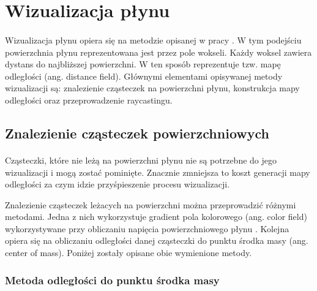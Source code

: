 \newpage

\section{Wizualizacja płynu}

\paragraph{}
Wizualizacja płynu opiera się na metodzie opisanej w pracy \cite{goswami10}. W tym podejściu powierzchnia płynu reprezentowana jest przez pole wokseli. Każdy woksel zawiera dystans do najbliższej powierzchni. W ten sposób reprezentuje tzw. mapę odległości (ang. distance field). Głównymi elementami opisywanej metody wizualizacji są: znalezienie cząsteczek na powierzchni płynu, konstrukcja mapy odległości oraz przeprowadzenie raycastingu.
\par

\subsection{Znalezienie cząsteczek powierzchniowych}

\paragraph{}
Cząsteczki, które nie leżą na powierzchni płynu nie są potrzebne do jego wizualizacji i mogą zostać pominięte. Znacznie zmniejsza to koszt generacji mapy odległości za czym idzie przyśpieszenie procesu wizualizacji.
\par
Znalezienie cząsteczek leżacych na powierzchni można przeprowadzić różnymi metodami. Jedna z nich wykorzystuje gradient pola kolorowego (ang. color field) wykorzystywane przy obliczaniu napięcia powierzchniowego płynu \cite{kelager06}. Kolejna opiera się na obliczaniu odległości danej cząsteczki do punktu środka masy (ang. center of mass). Poniżej zostały opisane obie wymienione metody.

\subsubsection{Metoda odległości do punktu środka masy}

